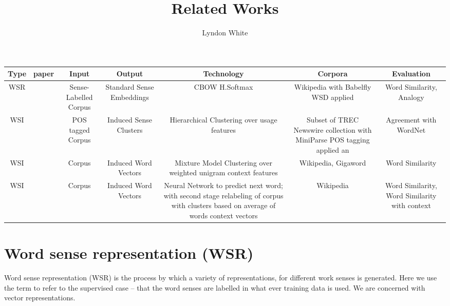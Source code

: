 \documentclass{article}
\title{Related Works}
\author{Lyndon White}
\begin{document}
\maketitle


\newcommand{\summaryfromcite}[1]{%
	\subsubsection{\Citetitle{#1} -- \citeauthor{#1} (\citeyear{#1})}%
	\fullcite{#1}%
	\smallskip \\%
	\citefield{#1}{annotation}%
}

\begin{table}
	\scriptsize

	\begin{tabulary}{\textwidth}{|C|K{1cm}|C|C|C|C|C|}
		\hline Type & paper & Input & Output & Technology & Corpora & Evaluation \\ 
		\hline  WSR & \parencite{iacobacci2015sensembed} & Sense-Labelled Corpus  & Standard Sense Embeddings & CBOW H.Softmax & Wikipedia with Babelfly WSD applied & Word Similarity, Analogy  \\ 
		\hline WSI &  \parencite{pantel2002WSI} & POS tagged Corpus  & Induced Sense Clusters & Hierarchical Clustering over usage features & Subset of TREC Newswire collection with MiniParse POS tagging applied an & Agreement with WordNet \\ 
		\hline WSI &  \parencite{Reisinger2010} & Corpus  & Induced Word Vectors & Mixture Model Clustering over weighted unigram context features & Wikipedia, Gigaword & Word Similarity \\
		\hline WSI &  \parencite{Huang2012} & Corpus  & Induced Word Vectors & Neural Network to predict next word; with second stage relabeling of corpus with clusters based on average of words context vectors & Wikipedia & Word Similarity, Word Similarity with context \\
		\hline 
	\end{tabulary} 
\end{table}

\section{Word sense representation (WSR)}
Word sense representation (WSR) is the process by which a variety of representations, for different work senses is generated.
Here we use the term to refer to the supervised case -- that the word senses are labelled in what ever training data is used.
We are concerned with vector representations.
 
\end{document}
